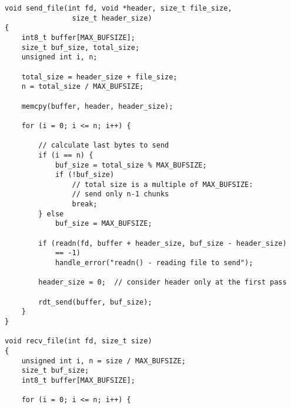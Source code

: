 \begin{lstlisting}[title=cmd\_commons.c]
void send_file(int fd, void *header, size_t file_size, 
				size_t header_size)								
{                                                                                                       
	int8_t buffer[MAX_BUFSIZE];                                                                         
	size_t buf_size, total_size;                                                                        
	unsigned int i, n;                                                                                  
																										
	total_size = header_size + file_size;                                                               
	n = total_size / MAX_BUFSIZE;                                                                       
																										
	memcpy(buffer, header, header_size);                                                                
																										
	for (i = 0; i <= n; i++) {                                                                          
																										
		// calculate last bytes to send                                         
		if (i == n) {           
			buf_size = total_size % MAX_BUFSIZE;                                                        
			if (!buf_size)                                                                              
				// total size is a multiple of MAX_BUFSIZE:
				// send only n-1 chunks        
				break;          
		} else                                                                                          
			buf_size = MAX_BUFSIZE;                                                                     
																										
		if (readn(fd, buffer + header_size, buf_size - header_size)
			== -1)                              
			handle_error("readn() - reading file to send");

		header_size = 0;  // consider header only at the first pass

		rdt_send(buffer, buf_size);
	}
}

void recv_file(int fd, size_t size)
{
	unsigned int i, n = size / MAX_BUFSIZE;
	size_t buf_size;
	int8_t buffer[MAX_BUFSIZE];
                                                                                              
	for (i = 0; i <= n; i++) {
                                                                                              

\end{lstlisting}
